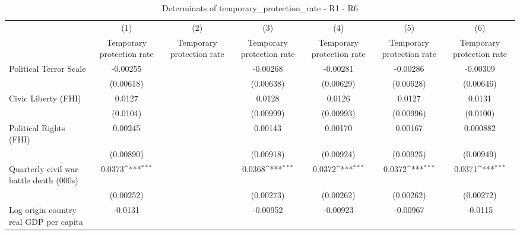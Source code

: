 \begin{table}[htbp]\centering
\def\sym#1{\ifmmode^{#1}\else\(^{#1}\)\fi}
\caption{Determinats of temporary\_protection\_rate - R1 - R6}
\begin{tabular}{l*{6}{c}}
\hline\hline
                    &\multicolumn{1}{c}{(1)}&\multicolumn{1}{c}{(2)}&\multicolumn{1}{c}{(3)}&\multicolumn{1}{c}{(4)}&\multicolumn{1}{c}{(5)}&\multicolumn{1}{c}{(6)}\\
                    &\multicolumn{1}{c}{Temporary protection rate}&\multicolumn{1}{c}{Temporary protection rate}&\multicolumn{1}{c}{Temporary protection rate}&\multicolumn{1}{c}{Temporary protection rate}&\multicolumn{1}{c}{Temporary protection rate}&\multicolumn{1}{c}{Temporary protection rate}\\
\hline
Political Terror Scale&    -0.00255         &                     &    -0.00268         &    -0.00281         &    -0.00286         &    -0.00309         \\
                    &   (0.00618)         &                     &   (0.00638)         &   (0.00629)         &   (0.00628)         &   (0.00646)         \\
[1em]
Civic Liberty (FHI) &      0.0127         &                     &      0.0128         &      0.0126         &      0.0127         &      0.0131         \\
                    &    (0.0104)         &                     &   (0.00999)         &   (0.00993)         &   (0.00996)         &    (0.0100)         \\
[1em]
Political Rights (FHI)&     0.00245         &                     &     0.00143         &     0.00170         &     0.00167         &    0.000882         \\
                    &   (0.00890)         &                     &   (0.00918)         &   (0.00924)         &   (0.00925)         &   (0.00949)         \\
[1em]
Quarterly civil war battle death (000s)&      0.0373\sym{***}&                     &      0.0368\sym{***}&      0.0372\sym{***}&      0.0372\sym{***}&      0.0371\sym{***}\\
                    &   (0.00252)         &                     &   (0.00273)         &   (0.00262)         &   (0.00262)         &   (0.00272)         \\
[1em]
Log origin country real GDP per capita&     -0.0131         &                     &    -0.00952         &    -0.00923         &    -0.00967         &     -0.0115         \\

\end{tabular}
\end{table}
